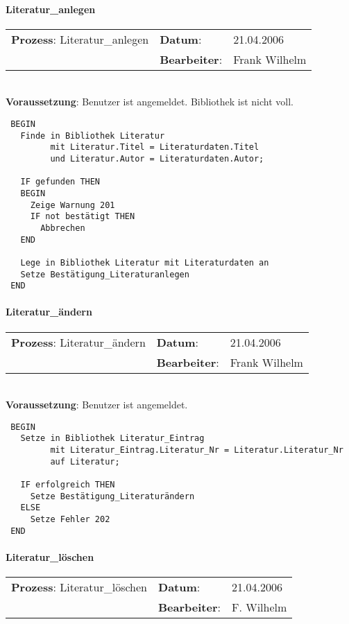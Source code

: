\paragraph{Literatur\_anlegen}
\begin{tabular}[t]{p{9.5cm}ll}
\textbf{Prozess}: Literatur\_anlegen  	&\textbf{Datum}:      &21.04.2006\\
					&\textbf{Bearbeiter}: &Frank Wilhelm\\
\end{tabular}

\hrulefill\\
\textbf{Voraussetzung}: Benutzer ist angemeldet. Bibliothek ist nicht voll.
\begin{verbatim}
 BEGIN
   Finde in Bibliothek Literatur
         mit Literatur.Titel = Literaturdaten.Titel
         und Literatur.Autor = Literaturdaten.Autor;
 
   IF gefunden THEN
   BEGIN
     Zeige Warnung 201
     IF not bestätigt THEN
       Abbrechen
   END
   
   Lege in Bibliothek Literatur mit Literaturdaten an
   Setze Bestätigung_Literaturanlegen
 END
\end{verbatim}
\hrulefill



\paragraph{Literatur\_ändern}
\begin{tabular}[t]{p{9.5cm}ll}
\textbf{Prozess}: Literatur\_ändern  	&\textbf{Datum}:      &21.04.2006\\
					&\textbf{Bearbeiter}: &Frank Wilhelm\\
\end{tabular}

\hrulefill\\
\textbf{Voraussetzung}: Benutzer ist angemeldet.
\begin{verbatim}
 BEGIN
   Setze in Bibliothek Literatur_Eintrag
         mit Literatur_Eintrag.Literatur_Nr = Literatur.Literatur_Nr
         auf Literatur;
  
   IF erfolgreich THEN
     Setze Bestätigung_Literaturändern
   ELSE
     Setze Fehler 202
 END
\end{verbatim}
\hrulefill



\paragraph{Literatur\_löschen}
\begin{tabular}[t]{p{9.5cm}ll}
\textbf{Prozess}: Literatur\_löschen  	&\textbf{Datum}:      &21.04.2006\\
					&\textbf{Bearbeiter}: &F. Wilhelm\\
\end{tabular}

